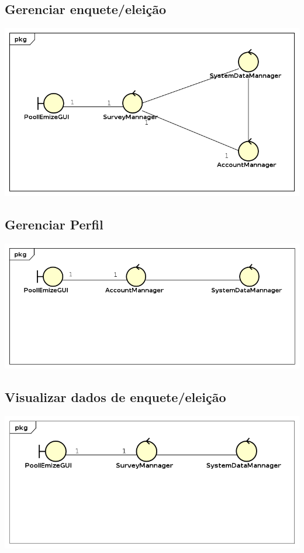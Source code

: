 \documentclass[a4paper,12pt]{report}
\begin{document}
\subsection*{Gerenciar enquete/eleição}
\markright{}
\includegraphics[width=14.3cm]{class_diagrams/VCPGerenciarEnquete.png}

\subsection*{Gerenciar Perfil}
\markright{}
\includegraphics[width=14.3cm]{class_diagrams/VCPGerenciarPerfil.png}

\subsection*{Visualizar dados de enquete/eleição}
\markright{}
\includegraphics[width=14.3cm]{class_diagrams/VCPVisualizarDadosEnquete.png}
\end{document}
